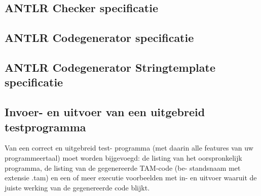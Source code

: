 \documentclass[]{article}
\begin{document}


\newpage
\subsection{ANTLR Checker specificatie}


\newpage
\subsection{ANTLR Codegenerator specificatie}


\begin{landscape}
\newpage
\subsection{ANTLR Codegenerator Stringtemplate specificatie}

\end{landscape}

\newpage
\subsection{Invoer- en uitvoer van een uitgebreid testprogramma}
Van een correct en uitgebreid test-
programma (met daarin alle features van uw programmeertaal) moet worden bijgevoegd: de
listing van het oorspronkelijk programma, de listing van de gegenereerde TAM-code (be-
standsnaam met extensie .tam) en een of meer executie voorbeelden met in- en uitvoer
waaruit de juiste werking van de gegenereerde code blijkt.
\end{document}
